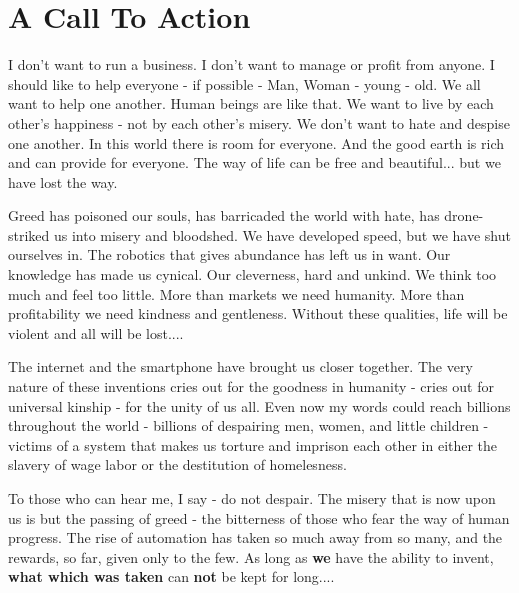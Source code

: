 \documentclass{article}
\begin{document}
\vspace{1cm}

\pagebreak


\section{A Call To Action}

{\fontsize{11pt}{11pt}\selectfont
I don't want to run a business. I don't want to manage or profit from
anyone. I should like to help everyone - if possible - Man, Woman -
young - old. We all want to help one another. Human beings are like
that. We want to live by each other's happiness - not by each other's
misery. We don't want to hate and despise one another. In this world
there is room for everyone. And the good earth is rich and can provide
for everyone. The way of life can be free and beautiful... but we have
lost the way.

Greed has poisoned our souls, has barricaded the world with hate, has
drone-striked us into misery and bloodshed. We have developed speed, but
we have shut ourselves in. The robotics that gives abundance has left us in
want. Our knowledge has made us cynical. Our cleverness, hard and
unkind. We think too much and feel too little. More than markets we need
humanity. More than profitability we need kindness and gentleness.
Without these qualities, life will be violent and all will be lost....

The internet and the smartphone have brought us closer together. The
very nature of these inventions cries out for the goodness in humanity -
cries out for universal kinship - for the unity of us all. Even now my
words could reach billions throughout the world - billions of
despairing men, women, and little children - victims of a system that
makes us torture and imprison each other in either the slavery of wage labor or the destitution of homelesness.

To those who can hear me, I say - do not despair. The misery that is now
upon us is but the passing of greed - the bitterness of those who fear
the way of human progress. The rise of automation has taken so much away
from so many, and the rewards, so far, given only to the few. As long as
\textbf{we} have the ability to invent, \textbf{what which was taken} can
\textbf{not} be kept for long....

}
\end{document}
